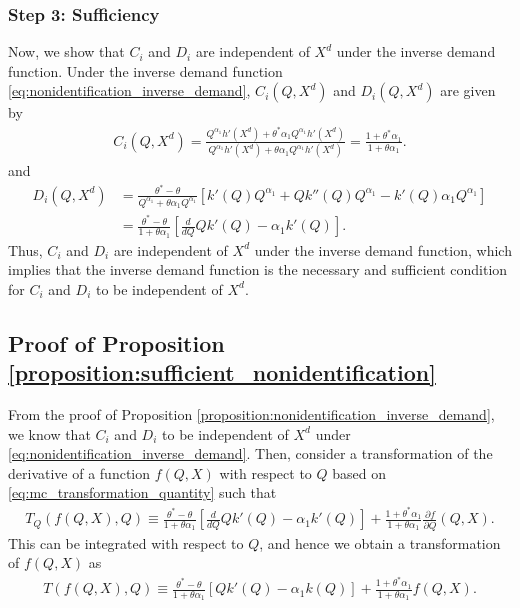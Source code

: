 \documentclass[11pt, a4paper]{article}
\theoremstyle{remark}
\begin{document}
\subsubsection*{Step 3: Sufficiency}
Now, we show that $C_i$ and $D_i$ are independent of $X^{d}$ under the inverse demand function.
Under the inverse demand function \eqref{eq:nonidentification_inverse_demand}, $C_i(Q, X^{d})$ and $D_i(Q, X^{d})$ are given by
\begin{align}
    C_i(Q, X^{d}) = \frac{Q^{\alpha_1}h'(X^{d}) + \theta^{*}\alpha_1Q^{\alpha_1}h'(X^{d})}{Q^{\alpha_1}h'(X^{d}) + \theta \alpha_1 Q^{\alpha_1}h'(X^{d})} = \frac{1 + \theta^{*}\alpha_1}{1 + \theta\alpha_1}.
\end{align}
and
\begin{align}
    D_i(Q, X^{d}) & = \frac{\theta^{*} - \theta}{Q^{\alpha_1} + \theta \alpha_1Q^{\alpha_1}} \left[ k'(Q)Q^{\alpha_1} + Qk''(Q) Q^{\alpha_1} - k'(Q)\alpha_1Q^{\alpha_1} \right]\\
    &= \frac{\theta^{*} - \theta}{1 + \theta\alpha_1} \left[\frac{d}{dQ}Qk'(Q)  -\alpha_1k'(Q) \right].
\end{align}
Thus, $C_i$ and $D_i$ are independent of $X^{d}$ under the inverse demand function, which implies that the inverse demand function is the necessary and sufficient condition for $C_i$ and $D_i$ to be independent of $X^{d}$.



\subsection{Proof of Proposition \ref{proposition:sufficient_nonidentification}}

From the proof of Proposition \ref{proposition:nonidentification_inverse_demand}, we know that $C_i$ and $D_i$ to be independent of $X^{d}$ under \eqref{eq:nonidentification_inverse_demand}.
Then, consider a transformation of the derivative of a function $f(Q, X)$ with respect to $Q$ based on \eqref{eq:mc_transformation_quantity} such that
\begin{align}
    T_Q\left(f(Q,X), Q\right) \equiv \frac{\theta^{*} - \theta}{1 + \theta\alpha_1}\left[\frac{d}{dQ}Qk'(Q)  -\alpha_1k'(Q) \right]+ \frac{1 + \theta^{*}\alpha_1}{1 + \theta\alpha_1} \frac{\partial f}{\partial Q}(Q, X).
\end{align}
This can be integrated with respect to $Q$, and hence we obtain a transformation of $f(Q, X)$ as
\begin{align}
    T\left(f(Q,X), Q\right) \equiv \frac{\theta^{*} - \theta}{1 + \theta\alpha_1} \left[Qk'(Q) - \alpha_1k(Q) \right] + \frac{1 + \theta^{*}\alpha_1}{1 + \theta\alpha_1} f(Q, X).
\end{align}
\end{document}
